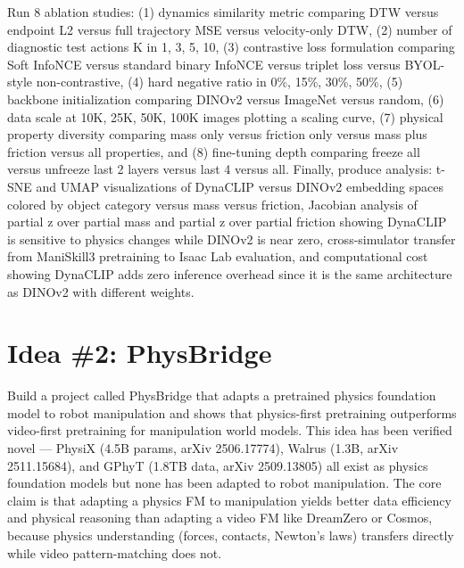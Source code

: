 \documentclass[11pt,a4paper]{article}
\begin{document}
Run 8 ablation studies: (1) dynamics similarity metric comparing DTW versus endpoint L2 versus full trajectory MSE versus velocity-only DTW, (2) number of diagnostic test actions K in 1, 3, 5, 10, (3) contrastive loss formulation comparing Soft InfoNCE versus standard binary InfoNCE versus triplet loss versus BYOL-style non-contrastive, (4) hard negative ratio in 0\%, 15\%, 30\%, 50\%, (5) backbone initialization comparing DINOv2 versus ImageNet versus random, (6) data scale at 10K, 25K, 50K, 100K images plotting a scaling curve, (7) physical property diversity comparing mass only versus friction only versus mass plus friction versus all properties, and (8) fine-tuning depth comparing freeze all versus unfreeze last 2 layers versus last 4 versus all. Finally, produce analysis: t-SNE and UMAP visualizations of DynaCLIP versus DINOv2 embedding spaces colored by object category versus mass versus friction, Jacobian analysis of partial z over partial mass and partial z over partial friction showing DynaCLIP is sensitive to physics changes while DINOv2 is near zero, cross-simulator transfer from ManiSkill3 pretraining to Isaac Lab evaluation, and computational cost showing DynaCLIP adds zero inference overhead since it is the same architecture as DINOv2 with different weights.

\section{Idea \#2: PhysBridge}

Build a project called PhysBridge that adapts a pretrained physics foundation model to robot manipulation and shows that physics-first pretraining outperforms video-first pretraining for manipulation world models. This idea has been verified novel --- PhysiX (4.5B params, arXiv 2506.17774), Walrus (1.3B, arXiv 2511.15684), and GPhyT (1.8TB data, arXiv 2509.13805) all exist as physics foundation models but none has been adapted to robot manipulation. The core claim is that adapting a physics FM to manipulation yields better data efficiency and physical reasoning than adapting a video FM like DreamZero or Cosmos, because physics understanding (forces, contacts, Newton's laws) transfers directly while video pattern-matching does not.
\end{document}
